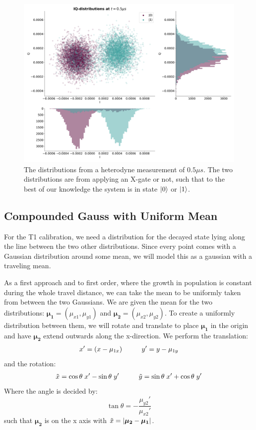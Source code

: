 \begin{figure}
    \centering
    \includegraphics{Figs/Results/IQ_plane_initial/IQ_raw_at_0.5.png}
    \caption{The distributions from a heterodyne measurement of $0.5 \mu s$. The two distributions are from applying an X-gate or not, such that to the best of our knowledge the system is in state $\ket{0}$ or $\ket{1}$.}
    \label{fig:raw_data_initial_IQ}
\end{figure}


\subsection{Compounded Gauss with Uniform Mean}
For the T1 calibration, we need a distribution for the decayed state lying along the line between the two other distributions. Since every point comes with a Gaussian distribution around some mean, we will model this as a gaussian with a traveling mean.

As a first approach and to first order, where the growth in population is constant during the whole travel distance, we can take the mean to be uniformly taken from between the two Gaussians. We are given the mean for the two distributions: $\boldsymbol{\mu_1} = (\mu_{x1}, \mu_{y1})$ and $\boldsymbol{\mu_2} = (\mu_{x2}, \mu_{y2})$. To create a uniformly distribution between them, we will rotate and translate to place $\boldsymbol{\mu_1}$ in the origin and have $\boldsymbol{\mu_2}$ extend outwards along the x-direction. We perform the translation:
\begin{align*}
    x' = (x - \mu_{1x}) \hspace{1 cm} y' = y - \mu_{1y}
\end{align*}
and the rotation:
\begin{align*}
    \Tilde{x} = \cos\theta \; x' - \sin\theta \; y' \hspace{1cm} \Tilde{y} =  \sin\theta \; x' + \cos\theta \; y' 
\end{align*}
Where the angle is decided by:
\begin{equation}
    \tan \theta = - \frac{\mu_{y2}'}{\mu_{x2}'} 
\end{equation}
such that  $\boldsymbol{\mu_{2}}$ is on the x axis with $\Tilde{x} = |\boldsymbol{\mu_{2}} - \boldsymbol{\mu_{1}}|$.

